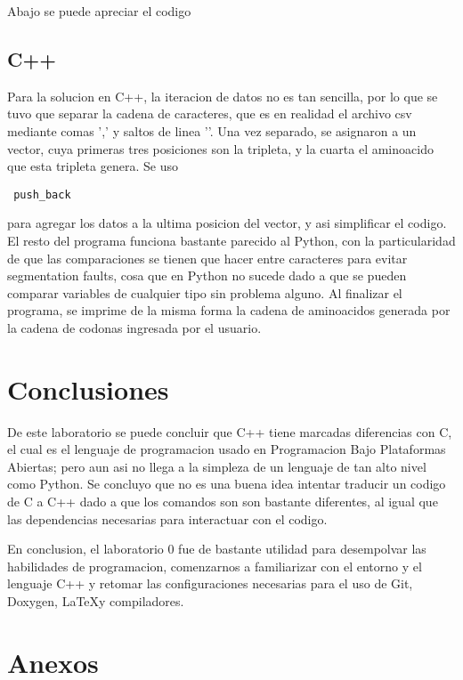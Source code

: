 \documentclass[12pt,letterpaper]{report}
\begin{document}
Abajo se puede apreciar el codigo

\section{C++}

Para la solucion en C++, la iteracion de datos no es tan sencilla, por lo que se tuvo que separar la cadena de caracteres, que es en realidad el archivo csv mediante comas ',' y saltos de linea '\n'. Una vez separado, se asignaron a un vector, cuya primeras tres posiciones son la tripleta, y la cuarta el aminoacido que esta tripleta genera. Se uso \begin{verbatim} push_back \end{verbatim} para agregar los datos a la ultima posicion del vector, y asi simplificar el codigo. El resto del programa funciona bastante parecido al Python, con la particularidad de que las comparaciones se tienen que hacer entre caracteres para evitar segmentation faults, cosa que en Python no sucede dado a que se pueden comparar variables de cualquier tipo sin problema alguno. Al finalizar el programa, se imprime de la misma forma la cadena de aminoacidos generada por la cadena de codonas ingresada por el usuario.

\chapter{Conclusiones}

De este laboratorio se puede concluir que C++ tiene marcadas diferencias con C, el cual es el lenguaje de programacion usado en Programacion Bajo Plataformas Abiertas; pero aun asi no llega a la simpleza de un lenguaje de tan alto nivel como Python. 
Se concluyo que no es una buena idea intentar traducir un codigo de C a C++ dado a que los comandos son son bastante diferentes, al igual que las dependencias necesarias para interactuar con el codigo. 

En conclusion, el laboratorio 0 fue de bastante utilidad para desempolvar las habilidades de programacion, comenzarnos a familiarizar con el entorno y el lenguaje C++ y retomar las configuraciones necesarias para el uso de Git, Doxygen, \LaTeX y compiladores.


\chapter{Anexos}
\end{document}
